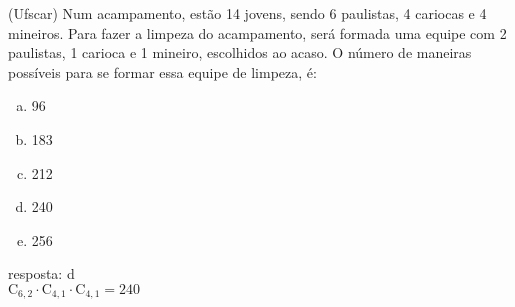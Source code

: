 \begin{ex}
 (Ufscar) Num acampamento, estão 14 jovens, sendo 6 paulistas, 4 cariocas e 4 mineiros. Para fazer a limpeza do acampamento, será formada uma equipe com 2 paulistas, 1 carioca e 1 mineiro, escolhidos ao acaso. O número de maneiras possíveis para se formar essa equipe de limpeza, é:
    \begin{enumerate}[(a)]
    \item 96
    \item 183
    \item 212
    \item 240
    \item 256
    \end{enumerate}
      \begin{sol}
       resposta: d \\
       $\mathrm{C}_{6,2}\cdot\mathrm{C}_{4,1}\cdot\mathrm{C}_{4,1}=240$
      \end{sol}
\end{ex}